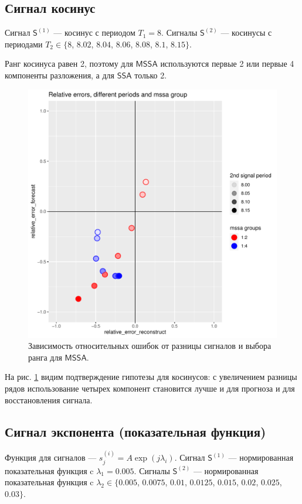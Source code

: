 \documentclass[specialist, substylefile = spbureport.rtx,
    subf,href,colorlinks=true, 12pt]{disser}
\newcommand{\sfS}{\mathsf{S}}
\newcommand{\SSA}{\mathsf{SSA}}
\newcommand{\MSSA}{\mathsf{MSSA}}
\begin{document}
    \subsection{Сигнал косинус}
        Сигнал $\sfS^{(1)}$ --- косинус с периодом $T_1 = 8$.
        Сигналы $\sfS^{(2)}$ --- косинусы с периодами $T_2 \in \{8$, $8.02$, $8.04$, $8.06$, $8.08$, $8.1$, $8.15\}$.

        Ранг косинуса равен 2, поэтому для $\MSSA$ используются первые 2 или первые 4 компоненты разложения, а для $\SSA$ только 2.

        \begin{figure}[h]
            \centering
            \includegraphics[width=\textwidth]{experiment_1_cos.pdf}
            \caption{Зависимость относительных ошибок от разницы сигналов и выбора ранга для $\MSSA$.}
            \label{fig:exp1_cos}
        \end{figure}

        На рис. \ref{fig:exp1_cos} видим подтверждение гипотезы для косинусов: с увеличением разницы рядов использование четырех компонент становится лучше и для прогноза и для восстановления сигнала.

    \subsection{Сигнал экспонента (показательная функция)}
        Функция для сигналов --- $s^{(i)}_j = A \exp(j\lambda_i)$.
        Сигнал $\sfS^{(1)}$ --- нормированная показательная функция c $\lambda_1 = 0.005$.
        Сигналы $\sfS^{(2)}$ --- нормированная показательная функция c $\lambda_2 \in \{0.005$, $0.0075$, $0.01$, $0.0125$, $0.015$, $0.02$, $0.025$, $0.03\}$.
\end{document}
